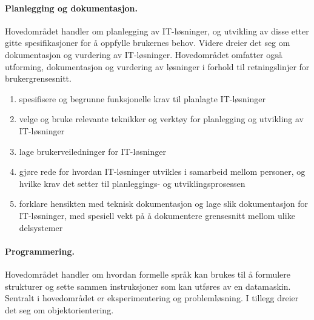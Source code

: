 \documentclass[%
oneside,                 %
final,                   %
10pt]{article}
\newenvironment{notice_mdfboxadmon}[1][]{
\begin{notice_mdfboxmdframed}[frametitle=#1]
}
{
\end{notice_mdfboxmdframed}
}
\begin{document}
\paragraph{Planlegging og dokumentasjon.}
Hovedområdet handler om planlegging av IT-løsninger, og utvikling av
disse etter gitte spesifikasjoner for å oppfylle brukernes
behov. Videre dreier det seg om dokumentasjon og vurdering av
IT-løsninger. Hovedområdet omfatter også utforming, dokumentasjon og
vurdering av løsninger i forhold til retningslinjer for
brukergrensesnitt.


\begin{notice_mdfboxadmon}
\begin{enumerate}
\item spesifisere og begrunne funksjonelle krav til planlagte IT-løsninger 

\item velge og bruke relevante teknikker og verktøy for planlegging og utvikling av IT-løsninger

\item lage brukerveiledninger for IT-løsninger

\item gjøre rede for hvordan IT-løsninger utvikles i samarbeid mellom personer, og hvilke krav det setter til planleggings- og utviklingsprosessen

\item forklare hensikten med teknisk dokumentasjon og lage slik dokumentasjon for IT-løsninger, med spesiell vekt på å dokumentere grensesnitt mellom ulike delsystemer
\end{enumerate}

\noindent
\end{notice_mdfboxadmon}



\paragraph{Programmering.}
Hovedområdet handler om hvordan formelle språk kan brukes til å
formulere strukturer og sette sammen instruksjoner som kan utføres av
en datamaskin. Sentralt i hovedområdet er eksperimentering og
problemløsning. I tillegg dreier det seg om objektorientering.
\end{document}

